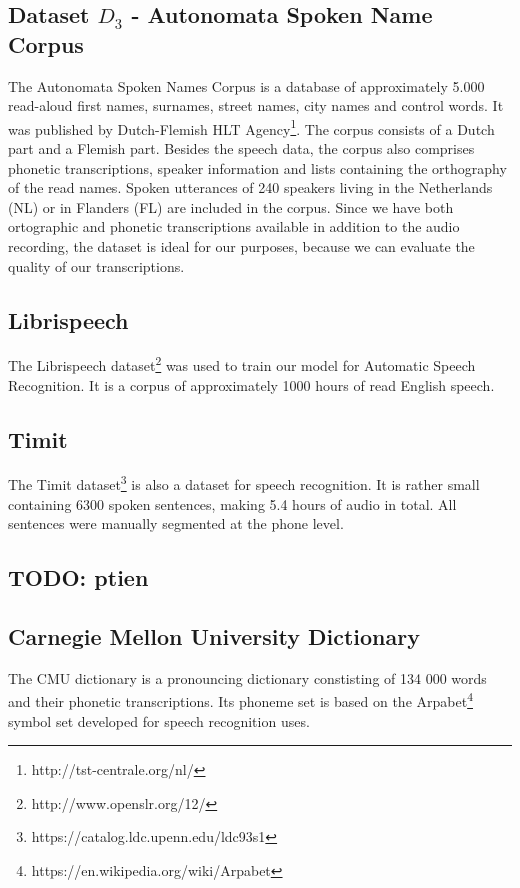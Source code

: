 \subsection{Dataset \textbf{$D_3$} - Autonomata Spoken Name Corpus}
The Autonomata Spoken Names Corpus \cite{van2008autonomata} is a database of approximately 5.000 read-aloud first names, surnames, street names, city names and control words.
It was  published by Dutch-Flemish HLT Agency\footnote{http://tst-centrale.org/nl/}.
The corpus consists of a Dutch part and a Flemish part.
Besides the speech data, the corpus also comprises phonetic transcriptions, speaker information and lists containing the orthography of the read names.
Spoken utterances of 240 speakers living in the Netherlands (NL) or in Flanders (FL) are included in the corpus.
Since we have both ortographic and phonetic transcriptions available in addition to the audio recording, the dataset is ideal for our purposes, because we can evaluate the quality of our transcriptions.
\subsection{Librispeech}
The Librispeech dataset\footnote{http://www.openslr.org/12/} was used to train our model for Automatic Speech Recognition.
It is a corpus of approximately 1000 hours of read English speech.
\subsection{Timit}
The Timit dataset\footnote{https://catalog.ldc.upenn.edu/ldc93s1} is also a dataset for speech recognition. It is rather small containing 6300 spoken sentences, making 5.4 hours of audio in total.
All sentences were manually segmented at the phone level. 
\subsection{TODO: ptien}
\subsection{Carnegie Mellon University Dictionary}
The CMU dictionary is a pronouncing dictionary constisting of 134 000 words and their phonetic transcriptions.
Its phoneme set is based on the Arpabet\footnote{https://en.wikipedia.org/wiki/Arpabet} symbol set developed for speech recognition uses.
